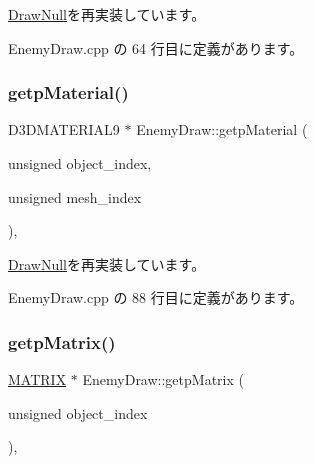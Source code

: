 \mbox{\hyperlink{class_draw_null_a7586cc78eed6bcaf2972ad7a6a70e665}{Draw\+Null}}を再実装しています。



 Enemy\+Draw.\+cpp の 64 行目に定義があります。

\mbox{\label{class_enemy_draw_a3f2885da84533364daaaac4a801fbc46}} 
\subsubsection{\texorpdfstring{getp\+Material()}{getpMaterial()}}
{\footnotesize\ttfamily D3\+D\+M\+A\+T\+E\+R\+I\+A\+L9 $\ast$ Enemy\+Draw\+::getp\+Material (\begin{DoxyParamCaption}\item[{unsigned}]{object\+\_\+index,  }\item[{unsigned}]{mesh\+\_\+index }\end{DoxyParamCaption})\hspace{0.3cm}{\ttfamily [override]}, {\ttfamily [virtual]}}



\mbox{\hyperlink{class_draw_null_aa07d7e89e723b68ec257da0f63d43f70}{Draw\+Null}}を再実装しています。



 Enemy\+Draw.\+cpp の 88 行目に定義があります。

\mbox{\label{class_enemy_draw_afbb8ac19041abda280ece7737103dc66}} 
\subsubsection{\texorpdfstring{getp\+Matrix()}{getpMatrix()}}
{\footnotesize\ttfamily \mbox{\hyperlink{_vector3_d_8h_a032295cd9fb1b711757c90667278e744}{M\+A\+T\+R\+IX}} $\ast$ Enemy\+Draw\+::getp\+Matrix (\begin{DoxyParamCaption}\item[{unsigned}]{object\+\_\+index }\end{DoxyParamCaption})\hspace{0.3cm}{\ttfamily [override]}, {\ttfamily [virtual]}}




